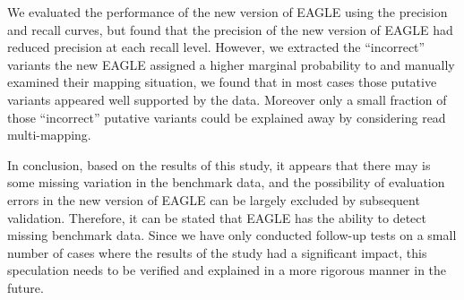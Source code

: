 \documentclass[PhD]{PHlab-thesis}
\begin{document}
{We evaluated the performance of the new version of EAGLE using the precision and recall curves, but found that the precision of the new version of EAGLE had reduced precision at each recall level.  However, we extracted the ``incorrect'' variants the new EAGLE assigned a higher marginal probability to and manually examined their mapping situation, we found that in most cases those putative variants appeared well supported by the data.  Moreover only a small fraction of those ``incorrect'' putative variants could be explained away by considering read multi-mapping.

In conclusion, based on the results of this study, it appears that there may is some missing variation in the benchmark data, and the possibility of evaluation errors in the new version of EAGLE can be largely excluded by subsequent validation. Therefore, it can be stated that EAGLE has the ability to detect missing benchmark data. Since we have only conducted follow-up tests on a small number of cases where the results of the study had a significant impact, this speculation needs to be verified and explained in a more rigorous manner in the future.
}
\end{document}
